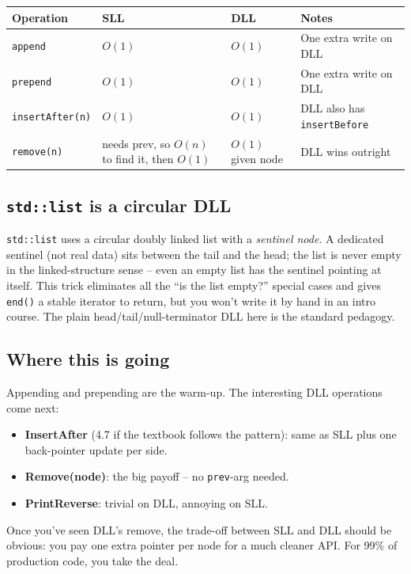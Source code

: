 \documentclass[11pt]{article}
\begin{document}
\begin{center}
\footnotesize
\renewcommand{\arraystretch}{1.3}
\begin{tabular}{@{}llll@{}}
\hline
\textbf{Operation}    & \textbf{SLL} & \textbf{DLL} & \textbf{Notes} \\
\hline
\texttt{append}       & $O(1)$       & $O(1)$        & One extra write on DLL \\
\texttt{prepend}      & $O(1)$       & $O(1)$        & One extra write on DLL \\
\texttt{insertAfter(n)} & $O(1)$    & $O(1)$        & DLL also has \texttt{insertBefore} \\
\texttt{remove(n)}   & needs prev, so $O(n)$ to find it, then $O(1)$ & $O(1)$ given node & DLL wins outright \\
\hline
\end{tabular}
\end{center}

\subsection{\texttt{std::list} is a circular DLL}

\begin{notebox}
\texttt{std::list} uses a circular doubly linked list with a
\emph{sentinel node}. A dedicated sentinel (not real data) sits
between the tail and the head; the list is never empty in the
linked-structure sense -- even an empty list has the sentinel
pointing at itself. This trick eliminates all the ``is the list
empty?'' special cases and gives \texttt{end()} a stable iterator
to return, but you won't write it by hand in an intro course. The
plain head/tail/null-terminator DLL here is the standard pedagogy.
\end{notebox}

\subsection{Where this is going}

\begin{ideabox}
Appending and prepending are the warm-up. The interesting DLL
operations come next:
\begin{itemize}[leftmargin=*]
  \item \textbf{InsertAfter} (4.7 if the textbook follows the
        pattern): same as SLL plus one back-pointer update per side.
  \item \textbf{Remove(node)}: the big payoff -- no
        \texttt{prev}-arg needed.
  \item \textbf{PrintReverse}: trivial on DLL, annoying on SLL.
\end{itemize}
Once you've seen DLL's remove, the trade-off between SLL and DLL
should be obvious: you pay one extra pointer per node for a much
cleaner API. For 99\% of production code, you take the deal.
\end{ideabox}
\end{document}
